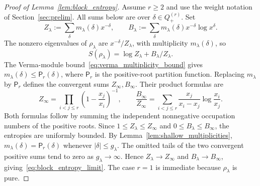 \documentclass[a4paper,onecolumn,11pt]{quantumarticle}
\begin{document}
\begin{proof}[Proof of Lemma~\ref{lem:block_entropy}]
Assume $r\ge2$ and use the weight notation of
Section~\ref{sec:prelim}. All sums below are over
$\delta\in Q_+^{(r)}$. Set
\[
Z_\lambda:=\sum_\delta m_\lambda(\delta)x^{-\delta},\qquad
B_\lambda:=\sum_\delta m_\lambda(\delta)x^{-\delta}\log x^\delta.
\]
The nonzero eigenvalues of $\rho_\lambda$ are $x^{-\delta}/Z_\lambda$,
with multiplicity $m_\lambda(\delta)$, so
\[
S(\rho_\lambda)=\log Z_\lambda+B_\lambda/Z_\lambda.
\]
The Verma-module bound~\eqref{eq:verma_multiplicity_bound} gives
$m_\lambda(\delta)\le\mathsf P_r(\delta)$, where
$\mathsf P_r$ is the positive-root partition function.
Replacing $m_\lambda$ by $\mathsf P_r$ defines the convergent sums
$Z_\infty,B_\infty$. Their product formulas are
\[
Z_\infty=\prod_{i<j\le r}\left(1-\frac{x_j}{x_i}\right)^{-1},
\qquad
\frac{B_\infty}{Z_\infty}
=\sum_{i<j\le r}\frac{x_j}{x_i-x_j}\log\frac{x_i}{x_j}.
\]
Both formulas follow by summing the independent nonnegative
occupation numbers of the positive roots. Since
$1\le Z_\lambda\le Z_\infty$ and $0\le B_\lambda\le B_\infty$,
the entropies are uniformly bounded.
By Lemma~\ref{lem:shallow_multiplicities},
$m_\lambda(\delta)=\mathsf P_r(\delta)$ whenever $|\delta|\le g_\lambda$.
The omitted tails of the two convergent positive sums tend to zero
as $g_\lambda\to\infty$. Hence $Z_\lambda\to Z_\infty$ and
$B_\lambda\to B_\infty$, giving~\eqref{eq:block_entropy_limit}.
The case $r=1$ is immediate because $\rho_\lambda$ is pure.
\end{proof}
\end{document}
